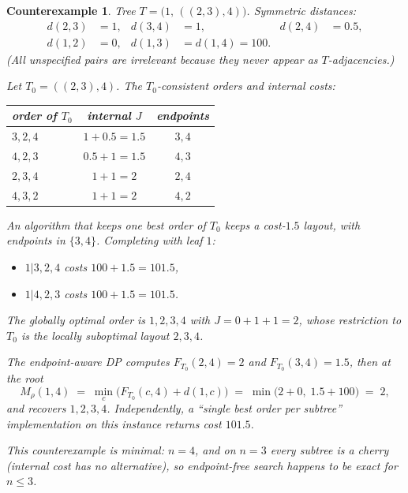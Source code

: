 \documentclass[11pt]{article}
\theoremstyle{plain}
\newtheorem{counterexample}[theorem]{Counterexample}
\begin{document}
\begin{counterexample}\label{ce:5.3}
Tree \(T = \bigl(1,\,((2,3),4)\bigr)\). Symmetric distances:
\[
\begin{aligned}
d(2,3) &= 1, &
d(3,4) &= 1, &
d(2,4) &= 0.5,\\
d(1,2) &= 0, &
d(1,3) &= d(1,4) = 100.
\end{aligned}
\]
(All unspecified pairs are irrelevant because they never appear as
\(T\)-adjacencies.)

Let \(T_0 = ((2,3),4)\). The \(T_0\)-consistent orders and internal costs:

\begin{center}
\begin{tabular}{lcc}
\toprule
order of \(T_0\) & internal \(J\) & endpoints \\
\midrule
\(3,2,4\) & \(1 + 0.5 = 1.5\) & \(3,4\) \\
\(4,2,3\) & \(0.5 + 1 = 1.5\) & \(4,3\) \\
\(2,3,4\) & \(1 + 1 = 2\) & \(2,4\) \\
\(4,3,2\) & \(1 + 1 = 2\) & \(4,2\) \\
\bottomrule
\end{tabular}
\end{center}

An algorithm that keeps one best order of \(T_0\) keeps a cost-\(1.5\) layout,
with endpoints in \(\{3,4\}\). Completing with leaf \(1\):

\begin{itemize}
\item \(1 \vert 3,2,4\) costs \(100 + 1.5 = 101.5\),
\item \(1 \vert 4,2,3\) costs \(100 + 1.5 = 101.5\).
\end{itemize}

The globally optimal order is \(1,2,3,4\) with \(J = 0+1+1 = 2\), whose
restriction to \(T_0\) is the \emph{locally suboptimal} layout \(2,3,4\).

The endpoint-aware DP computes \(F_{T_0}(2,4) = 2\) and \(F_{T_0}(3,4) = 1.5\),
then at the root
\[
M_\rho(1,4)
\;=\;
\min_c \bigl(F_{T_0}(c,4) + d(1,c)\bigr)
\;=\;
\min\bigl(2+0,\; 1.5+100\bigr)
\;=\;
2,
\]
and recovers \(1,2,3,4\). Independently, a ``single best order per subtree''
implementation on this instance returns cost \(101.5\).

This counterexample is minimal: \(n=4\), and on \(n=3\) every subtree is a
cherry (internal cost has no alternative), so endpoint-free search happens to
be exact for \(n \le 3\).
\end{counterexample}
\end{document}
